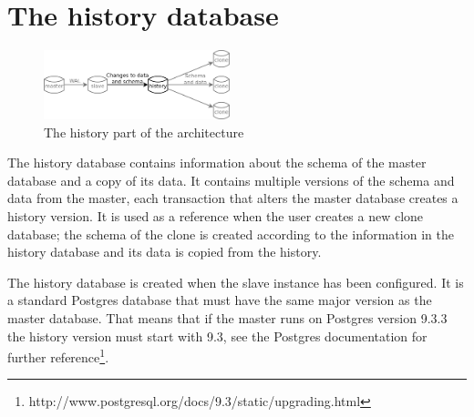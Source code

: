 \section{The history database}

\begin{figure}
  \vspace{-20pt}
  \begin{center}
    \includegraphics[width=0.48\textwidth]{img/architecture-history}
  \end{center}
  \vspace{-20pt}
  \caption{The history part of the architecture}
  \vspace{-10pt}
\end{figure}

The history database contains information about the schema of the master database and a copy of its data.
It contains multiple versions of the schema and data from the master, each transaction that alters the master database creates a history version.
It is used as a reference when the user creates a new clone database; the schema of the clone is created according to the information in the history database and its data is copied from the history.

The history database is created when the slave instance has been configured.
It is a standard Postgres database that must have the same major version as the master database.
That means that if the master runs on Postgres version 9.3.3 the history version must start with 9.3, see the Postgres documentation for further reference\footnote{http://www.postgresql.org/docs/9.3/static/upgrading.html}.




